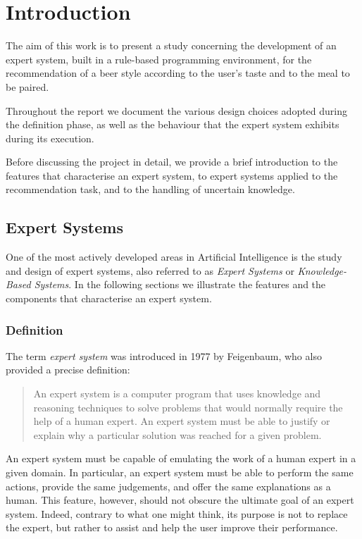 \chapter{Introduction}

The aim of this work is to present a study concerning the development of an
expert system, built in a rule-based programming environment, for the
recommendation of a beer style according to the user's taste and to the meal to
be paired.

Throughout the report we document the various design choices adopted during the
definition phase, as well as the behaviour that the expert system exhibits
during its execution.

Before discussing the project in detail, we provide a brief introduction to the
features that characterise an expert system, to expert systems applied to the
recommendation task, and to the handling of uncertain knowledge.


\section{Expert Systems}

One of the most actively developed areas in Artificial Intelligence is the study
and design of expert systems, also referred to as \emph{Expert Systems} or
\emph{Knowledge-Based Systems}. In the following sections we illustrate the
features and the components that characterise an expert system.


\subsection{Definition}

The term \emph{expert system} was introduced in 1977 by Feigenbaum, who also
provided a precise definition:

\begin{quotation}
An expert system is a computer program that uses knowledge and reasoning
techniques to solve problems that would normally require the help of a human
expert. An expert system must be able to justify or explain why a particular
solution was reached for a given problem.
\end{quotation}

An expert system must be capable of emulating the work of a human expert in a
given domain. In particular, an expert system must be able to perform the same
actions, provide the same judgements, and offer the same explanations as a
human. This feature, however, should not obscure the ultimate goal of an expert
system. Indeed, contrary to what one might think, its purpose is not to replace
the expert, but rather to assist and help the user improve their performance.

